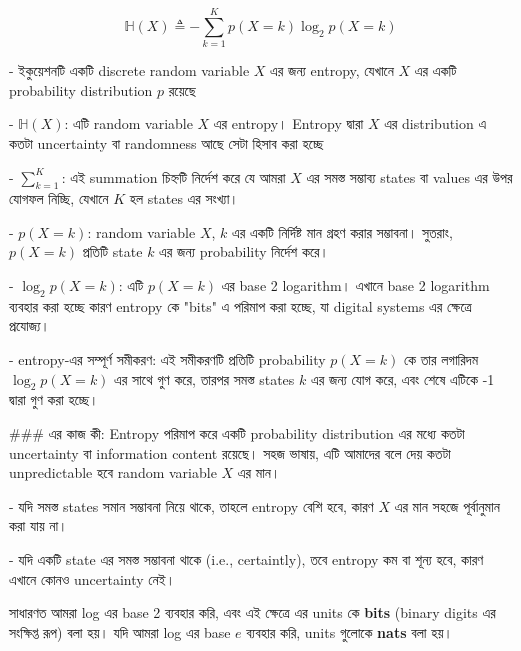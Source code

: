 \documentclass[graybox, envcountchap, twocolumn]{styles/svmult}
\begin{document}
\begin{equation}
\mathbb{H}(X) \triangleq -\sum\limits_{k=1}^{K}{p(X=k)\log_2p(X=k)}
\end{equation}

\bengalifont
-    ইকুয়েশনটি একটি discrete random variable $X$ এর জন্য entropy, যেখানে $X$ এর একটি probability distribution $p$ রয়েছে

-   $\mathbb{H}(X)$: {\bengalifont এটি random variable $X$ এর entropy। Entropy দ্বারা $X$ এর distribution এ কতটা uncertainty বা randomness আছে সেটা হিসাব করা হচ্ছে }

-   $\sum\limits_{k=1}^{K}$: {\bengalifont এই summation চিহ্নটি নির্দেশ করে যে আমরা $X$ এর সমস্ত সম্ভাব্য states বা values এর উপর যোগফল নিচ্ছি, যেখানে $K$ হল states এর সংখ্যা।}

-   $p(X=k)$: {\bengalifont random variable $X$, $k$ এর একটি নির্দিষ্ট মান গ্রহণ করার সম্ভাবনা।  সুতরাং, $p(X=k)$ প্রতিটি state $k$ এর জন্য probability নির্দেশ করে।}

- $\log_2 p(X=k)$: {\bengalifont এটি $p(X=k)$ এর base 2 logarithm। এখানে base 2 logarithm ব্যবহার করা হচ্ছে কারণ entropy কে "bits" এ পরিমাপ করা হচ্ছে, যা digital systems এর ক্ষেত্রে প্রযোজ্য।}

- {\bengalifont entropy-এর সম্পূর্ণ সমীকরণ}: {\bengalifont এই সমীকরণটি প্রতিটি probability $p(X=k)$ কে তার লগারিদম $\log_2 p(X=k)$ এর সাথে গুণ করে, তারপর সমস্ত states $k$ এর জন্য যোগ করে, এবং শেষে এটিকে -1 দ্বারা গুণ করা হচ্ছে।}

{\bengalifont 
### এর কাজ কী:
Entropy পরিমাপ করে একটি probability distribution এর মধ্যে কতটা uncertainty বা information content রয়েছে। সহজ ভাষায়, এটি আমাদের বলে দেয় কতটা unpredictable হবে random variable $X$ এর মান।}

- {\bengalifont যদি সমস্ত states সমান সম্ভাবনা নিয়ে থাকে, তাহলে entropy বেশি হবে, কারণ $X$ এর মান সহজে পূর্বানুমান করা যায় না।}

- {\bengalifont যদি একটি state এর সমস্ত সম্ভাবনা থাকে (i.e., certaintly), তবে entropy কম বা শূন্য হবে, কারণ এখানে কোনও uncertainty নেই।}


{\bengalifont সাধারণত আমরা log এর base 2 ব্যবহার করি, এবং এই ক্ষেত্রে এর units কে \textbf{bits} (binary digits এর সংক্ষিপ্ত রূপ) বলা হয়। যদি আমরা log এর base $e$ ব্যবহার করি, units গুলোকে \textbf{nats} বলা হয়।}
\end{document}
